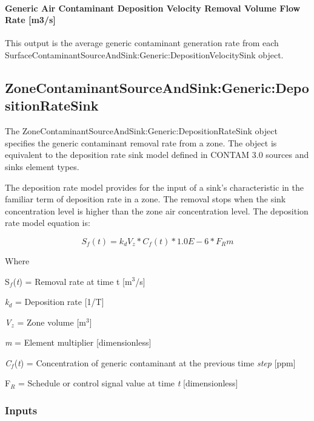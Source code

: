 \paragraph{Generic Air Contaminant Deposition Velocity Removal Volume Flow Rate {[}m3/s{]}}\label{generic-air-contaminant-deposition-velocity-removal-volume-flow-rate-m3s}

This output is the average generic contaminant generation rate from each Surface\-Contaminant\-Source\-And\-Sink:\-Generic:\-Deposition\-Velocity\-Sink object.

\subsection{Zone\-Con\-taminant\-Source\-And\-Sink:\-Generic:\-Deposition\-Rate\-Sink}\label{zonecontaminantsourceandsinkgenericdepositionratesink}

The Zone\-Contaminant\-Source\-And\-Sink:\-Generic:\-Deposition\-Rate\-Sink object specifies the generic contaminant removal rate from a zone. The object is equivalent to the deposition rate sink model defined in CONTAM 3.0 sources and sinks element types.

The deposition rate model provides for the input of a sink's characteristic in the familiar term of deposition rate in a zone. The removal stops when the sink concentration level is higher than the zone air concentration level. The deposition rate model equation is:

\begin{equation}
{S_f}(t) = {k_d}{V_z}*{C_f}(t)*1.0E - 6*{F_R}m
\end{equation}

Where

S\(_{f}\)(\emph{t}) = Removal rate at time t {[}m\(^{3}\)/s{]}

\emph{k\(_{d}\)} = Deposition rate {[}1/T{]}

\emph{V\(_{z}\)} = Zone volume {[}m\(^{3}\){]}

\emph{m} = Element multiplier {[}dimensionless{]}

\emph{C}\(_{f}\)(\emph{t}) = Concentration of generic contaminant at the previous time \emph{step} {[}ppm{]}

F\(_{R}\) = Schedule or control signal value at time \emph{t} {[}dimensionless{]}

\subsubsection{Inputs}\label{inputs-17-003}


